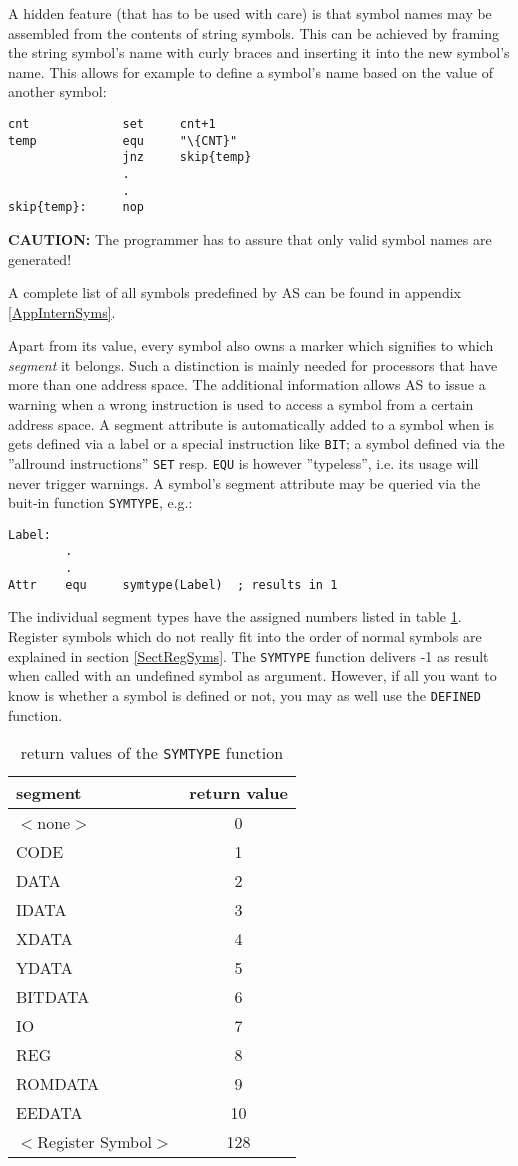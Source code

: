 \documentclass[12pt,twoside]{report}
\newcommand{\bb}[1]{{\bf #1}}
\newcommand{\tty}[1]{{\tt #1}}
\begin{document}
A hidden feature (that has to be used with care) is that symbol names
may be assembled from the contents of string symbols.  This can be
achieved by framing the string symbol's name with curly braces and
inserting it into the new symbol's name.  This allows for example to
define a symbol's name based on the value of another symbol:
\begin{verbatim}
cnt             set     cnt+1
temp            equ     "\{CNT}"
                jnz     skip{temp}
                .
                .
skip{temp}:     nop
\end{verbatim}
\bb{CAUTION:} The programmer has to assure that only valid symbol names
are generated!

A complete list of all symbols predefined by AS can be found in
appendix \ref{AppInternSyms}.

Apart from its value, every symbol also owns a marker which signifies to
which {\em segment} it belongs.  Such a distinction is mainly needed for
processors that have more than one address space.  The additional
information allows AS to issue a warning when a wrong instruction is used
to access a symbol from a certain address space.  A segment attribute is
automatically added to a symbol when is gets defined via a label or a
special instruction like \tty{BIT}; a symbol defined via the ''allround
instructions'' \tty{SET} resp. \tty{EQU} is however ''typeless'', i.e. its
usage will never trigger warnings.  A symbol's segment attribute may be
queried via the buit-in function \tty{SYMTYPE}, e.g.:
\begin{verbatim}
Label:
        .
        .
Attr    equ     symtype(Label)  ; results in 1
\end{verbatim}
The individual segment types have the assigned numbers listed in table
\ref{TabSegNums}.  Register symbols which do not really fit into the order
of normal symbols are explained in section \ref{SectRegSyms}.  The
\tty{SYMTYPE} function delivers -1 as result when called with an undefined
symbol as argument.  However, if all you want to know is whether a symbol
is defined or not, you may as well use the \tty{DEFINED} function.
\begin{table}[htb]
\begin{center}
\begin{tabular}{|l|c|}
\hline
segment & return value \\
\hline
$<$none$>$ & 0 \\
CODE & 1 \\
DATA & 2 \\
IDATA & 3 \\
XDATA & 4 \\
YDATA & 5 \\
BITDATA & 6 \\
IO & 7 \\
REG & 8 \\
ROMDATA & 9 \\
EEDATA & 10 \\
$<$Register Symbol$>$ & 128 \\
\hline
\end{tabular}
\end{center}
\caption{return values of the \tty{SYMTYPE} function\label{TabSegNums}}
\end{table}
\end{document}

